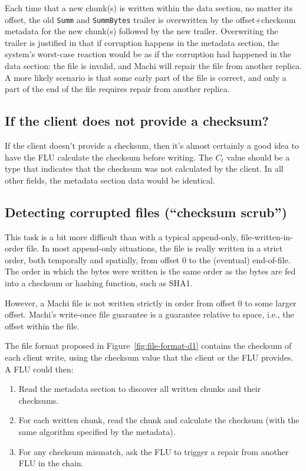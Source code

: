 \documentclass[preprint,10pt]{sigplanconf}
\begin{document}
Each time that a new chunk(s) is written within the data section, no
matter its offset, the old {\tt Summ} and {\tt SummBytes} trailer is
overwritten by the offset$+$checksum metadata for the new chunk(s)
followed by the new trailer.  Overwriting the trailer is justified in
that if corruption happens in the metadata section, the
system's worst-case reaction would be as if
the corruption had happened in the data section: the file
is invalid, and Machi will repair the file from another replica.
A more likely scenario is that some early part of the file is correct,
and only a part of the end of the file requires repair from another
replica.

\subsection{If the client does not provide a checksum?}

If the client doesn't provide a checksum, then it's almost certainly a
good idea to have the FLU calculate the checksum before writing.  The
$C_t$ value should be a type that indicates that the checksum was not
calculated by the client.  In all other fields, the metadata section
data would be identical.

\subsection{Detecting corrupted files (``checksum scrub'')}
\label{sub:detecting-corrupted}

This task is a bit more difficult than with a typical append-only,
file-written-in-order file.  In most append-only situations, the file
is really written in a strict order, both temporally and spatially,
from offset 0 to the (eventual)
end-of-file.  The order in which the bytes were written is the same
order as the bytes are fed into a checksum or
hashing function, such as SHA1.

However, a Machi file is not written strictly in order from offset 0
to some larger offset.  Machi's write-once file guarantee is a
guarantee relative to space, i.e., the offset within the file.

The file format proposed in Figure~\ref{fig:file-format-d1}
contains the checksum of each client write, using the checksum value
that the client or the FLU provides.  A FLU could then:

\begin{enumerate}
\item Read the metadata section to discover all written chunks and
  their checksums.
\item For each written chunk, read the chunk and calculate the
  checksum (with the same algorithm specified by the metadata).
\item For any checksum mismatch, ask the FLU to trigger a repair from
  another FLU in the chain.
\end{enumerate}
\end{document}
